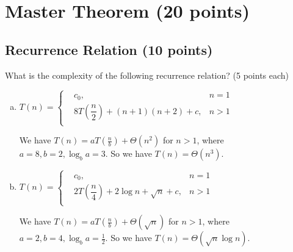 \documentclass[11pt]{exam}
\begin{document}
\newpage
\section{Master Theorem (20 points)}
\subsection{Recurrence Relation (10 points)}
What is the complexity of the following recurrence relation? (5 points each)
\begin{enumerate}[(a)]

    \item $T(n) = \left\{
              \begin{aligned}
                   & c_0,                                            & n=1 \\
                   & 8T\left(\dfrac{n}{2}\right)+(n + 1)(n + 2) + c, & n>1 \\
              \end{aligned}
              \right.
          $

          \begin{solution}
              We have $T(n)=aT(\frac{n}{b}) + \Theta(n^2) $ for $n>1$, where $a=8,b=2,\log_{b} a = 3$.
              So we have $T(n) = \Theta (n^3)$.

          \end{solution}

    \item $T(n) = \left\{
              \begin{aligned}
                   & c_0,                                            & n=1 \\
                   & 2T\left(\dfrac{n}{4}\right)+2\log n+\sqrt{n}+c, & n>1 \\
              \end{aligned}
              \right.
          $

          \begin{solution}
              We have $T(n)=aT(\frac{n}{b}) + \Theta(\sqrt{n}) $ for $n>1$, where $a=2,b=4, \log_{b} a = \frac{1}{2}$.
              So we have $T(n) = \Theta (\sqrt{n} \log n)$.
          \end{solution}
\end{enumerate}
\end{document}
